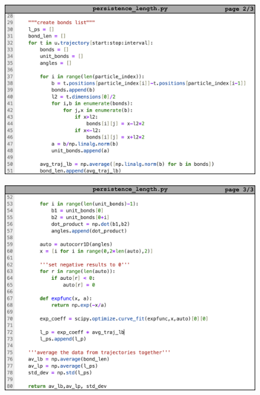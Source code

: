 \newpage 

\begin{figure}
    \centering
    \includegraphics[width=1\linewidth]{src/figures/pers_l_figs/pers_len2.png}
    \label{fig:pers_len2}
\end{figure}

\newpage 

\begin{figure}
    \centering
    \includegraphics[width=1\linewidth]{src/figures/pers_l_figs/pers_len3.png}
    \label{fig:pers_len3}
\end{figure}

\clearpage

